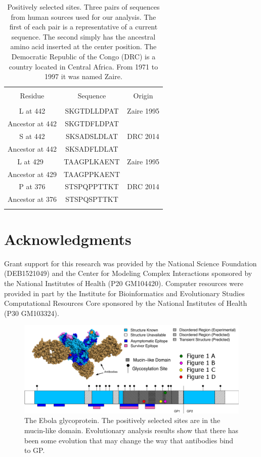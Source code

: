 \begin{table}[ht]
\caption{Positively selected sites. Three pairs of sequences from human sources used for our analysis. The first of each pair is a representative of a current sequence. The second simply has the ancestral amino acid inserted at the center position. The Democratic Republic of the Congo (DRC) is a country located in Central Africa. From 1971 to 1997 it was named Zaire.}
\centering
\begin{tabular}{ccc}
\hline \\
Residue & Sequence & Origin \\
\hline \\
L at 442 & SKGTDLLDPAT & Zaire 1995 \\
Ancestor at 442 & SKGTDFLDPAT & \\
S at 442 & SKSADSLDLAT & DRC 2014 \\
Ancestor at 442 & SKSADFLDLAT & \\
L at 429 & TAAGPLKAENT & Zaire 1995 \\
Ancestor at 429 & TAAGPPKAENT & \\
P at 376 & STSPQPPTTKT & DRC 2014 \\
Ancestor at 376 & STSPQSPTTKT &  \\
\hline \\
\end{tabular}
\label{possites}
\end{table}

\section{Acknowledgments}

Grant support for this research was provided by the National Science Foundation (DEB1521049) and the Center for Modeling Complex Interactions sponsored by the National Institutes of Health (P20 GM104420). Computer resources were provided in part by the Institute for Bioinformatics and Evolutionary Studies Computational Resources Core sponsored by the National Institutes of Health (P30 GM103324).


\begin{figure}[htbp]
    \centering
    \includegraphics[width=1 \textwidth]{figures/ebolagraphic002.png}
    \caption{The Ebola glycoprotein. The positively selected sites are in the mucin-like domain. Evolutionary analysis results show that there has been some evolution that may change the way that antibodies bind to GP.}
    \label{ebolagp}
\end{figure}

